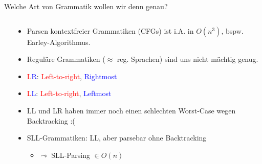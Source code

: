 \documentclass{beamer}
\begin{document}
\begin{frame}{Welche Art von Grammatik wollen wir denn genau?}
  \begin{columns}
    \begin{column}{0.5\textwidth}
    \end{column}
    \begin{column}{0.5\textwidth}
      \footnotesize

      \begin{itemize}
        \item Parsen kontextfreier Grammatiken (CFGs) ist i.A. in $O(n^3)$, bspw. Earley-Algorithmus.
        \item Reguläre Grammatiken ($\approx$ reg. Sprachen) sind uns nicht mächtig genug.
        \item \textcolor{red}{L}\textcolor{blue}{R}: \textcolor{red}{Left-to-right}, \textcolor{blue}{Rightmost}
        \item \textcolor{red}{L}\textcolor{blue}{L}: \textcolor{red}{Left-to-right}, \textcolor{blue}{Leftmost}
        \item LL und LR haben immer noch einen schlechten Worst-Case wegen Backtracking :(
        \item SLL-Grammatiken: LL, aber parsebar ohne Backtracking
        \begin{itemize}
          \item $\leadsto$ SLL-Parsing $\in O(n)$
        \end{itemize}
      \end{itemize}
    \end{column}
  \end{columns}
\end{frame}
\end{document}
